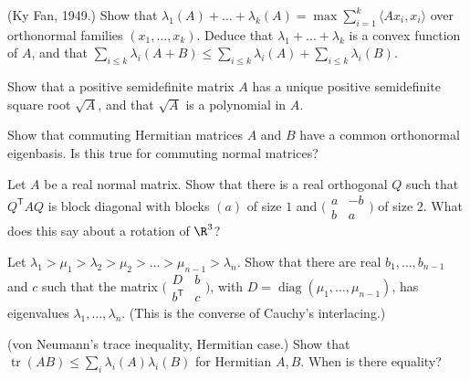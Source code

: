 \begin{exercise}[$\star\star$]\label{ex:kyfan}
(Ky Fan, 1949.) Show that $\lambda_1(A)+\dots+\lambda_k(A)=\max\sum_{i=1}^k\langle Ax_i,x_i\rangle$ over orthonormal families
$(x_1,\dots,x_k)$. Deduce that $\lambda_1+\dots+\lambda_k$ is a convex function of $A$, and that
$\sum_{i\le k}\lambda_i(A+B)\le\sum_{i\le k}\lambda_i(A)+\sum_{i\le k}\lambda_i(B)$.
\end{exercise}

\begin{exercise}[$\star\star$]\label{ex:sqrtpsd}
Show that a positive semidefinite matrix $A$ has a unique positive semidefinite square root $\sqrt A$, and that $\sqrt A$
is a polynomial in $A$.
\end{exercise}

\begin{exercise}[$\star\star$]\label{ex:simultaneous}
Show that commuting Hermitian matrices $A$ and $B$ have a common orthonormal eigenbasis. Is this true for commuting normal
matrices?
\end{exercise}

\begin{exercise}[$\star\star$]\label{ex:realnormal}
Let $A$ be a real normal matrix. Show that there is a real orthogonal $Q$ such that $Q^{\mathsf T}AQ$ is block diagonal
with blocks $(a)$ of size $1$ and $\bigl(\begin{smallmatrix}a&-b\\b&a\end{smallmatrix}\bigr)$ of size $2$. What does this say
about a rotation of $\R^3$?
\end{exercise}

\begin{exercise}[$\star\star\star$]\label{ex:bordered}
Let $\lambda_1>\mu_1>\lambda_2>\mu_2>\dots>\mu_{n-1}>\lambda_n$. Show that there are real $b_1,\dots,b_{n-1}$ and $c$ such that
the matrix $\bigl(\begin{smallmatrix}D&b\\b^{\mathsf T}&c\end{smallmatrix}\bigr)$, with $D=\operatorname{diag}(\mu_1,\dots,
\mu_{n-1})$, has eigenvalues $\lambda_1,\dots,\lambda_n$. (This is the converse of Cauchy's interlacing.)
\end{exercise}

\begin{exercise}[$\star\star\star$]\label{ex:vonneumann}
(von Neumann's trace inequality, Hermitian case.) Show that $\operatorname{tr}(AB)\le\sum_i\lambda_i(A)\lambda_i(B)$ for
Hermitian $A,B$. When is there equality?
\end{exercise}

